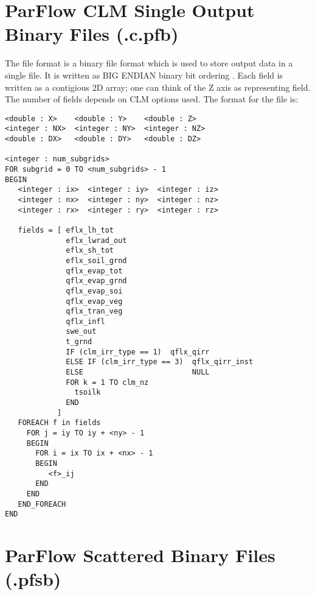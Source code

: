 \section{ParFlow CLM Single Output Binary Files (.c.pfb)}
\label{ParFlow Binary Files (.c.pfb)}

The  file format is a binary file format which is used to
store  output data in a single file.  It is written as BIG
ENDIAN binary bit ordering \cite{endian}.  Each field is written as a
contigious 2D array; one can think of the Z axis as representing
field.  The number of fields depends on CLM options used.  The format
for the file is:

\begin{display}\begin{verbatim}
<double : X>    <double : Y>    <double : Z>
<integer : NX>  <integer : NY>  <integer : NZ>
<double : DX>   <double : DY>   <double : DZ>

<integer : num_subgrids>
FOR subgrid = 0 TO <num_subgrids> - 1
BEGIN
   <integer : ix>  <integer : iy>  <integer : iz>
   <integer : nx>  <integer : ny>  <integer : nz>
   <integer : rx>  <integer : ry>  <integer : rz>

   fields = [ eflx_lh_tot
              eflx_lwrad_out
              eflx_sh_tot
              eflx_soil_grnd
              qflx_evap_tot
              qflx_evap_grnd
              qflx_evap_soi
              qflx_evap_veg
              qflx_tran_veg
              qflx_infl
              swe_out
              t_grnd
              IF (clm_irr_type == 1)  qflx_qirr
              ELSE IF (clm_irr_type == 3)  qflx_qirr_inst
              ELSE                         NULL
              FOR k = 1 TO clm_nz
                tsoilk
              END
            ]
   FOREACH f in fields
     FOR j = iy TO iy + <ny> - 1
     BEGIN
       FOR i = ix TO ix + <nx> - 1
       BEGIN
          <f>_ij
       END
     END
   END_FOREACH
END
\end{verbatim}\end{display}


\section{ParFlow Scattered Binary Files (.pfsb)}
\label{ParFlow Scattered Binary Files (.pfsb)}

